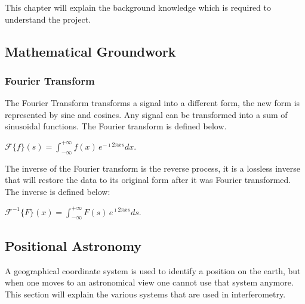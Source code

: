 This chapter will explain the background knowledge which is required to understand the project.
\subsection{Mathematical Groundwork}
\subsubsection{Fourier Transform}
The Fourier Transform transforms a signal into a different form, the new form is represented by sine and cosines. Any signal can be transformed into a sum of sinusoidal functions\cite{Fourier}. The Fourier transform is defined below.\\
\begin{center}
$\mathcal{F}\{f\}(s) = \int_{-\infty}^{+\infty}f(x)\,e^{-\imath 2\pi xs}dx.$    
\end{center}
The inverse of the Fourier transform is the reverse process, it is a lossless inverse that will restore the data to its original form after it was Fourier transformed. The inverse is defined below:
\begin{center}
$\mathcal{F}^{-1}\{F\}(x) = \int_{-\infty}^{+\infty}F(s)\,e^{\imath 2\pi xs}ds$.
\end{center}

\subsection{Positional Astronomy}
A geographical coordinate system is used to identify a position on the earth, but when one moves to an astronomical view one cannot use that system anymore. This section will explain the various systems that are used in interferometry\cite{TEXTBOOK}\cite{Astronomy}. 
